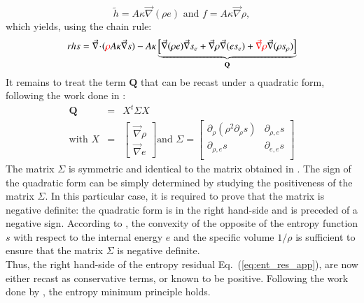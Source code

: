 \documentclass[preprint,10pt]{elsarticle}
\renewcommand{\div}{\vec{\nabla}\! \cdot \!}
\newcommand{\grad}{\vec{\nabla}}
\newcommand{\eqt}[1]{Eq.~(\ref{#1})}                     %
\newcommand{\tcr}[1]{\textcolor{red}{#1}}
\begin{document}
\begin{equation}
\tilde{h} = A \kappa \grad ( \rho e ) \text{ and } f = A \kappa \grad \rho, \nonumber 
\end{equation}
which yields, using the chain rule:
\begin{equation}
rhs = \div (\tcr{\rho} A \kappa \grad s ) - A \kappa \underbrace{\left[ \grad (\rho e) \grad s_e  + \grad \rho \grad (e s_e) +  \tcr{\grad \rho} \grad ( \rho s_{\rho} )  \right]}_{\mathbf{Q}} \nonumber
\end{equation}
It remains to treat the term $\mathbf{Q}$ that can be recast under a quadratic form, following the work done in \cite{jlg}:
\begin{eqnarray}
\mathbf{Q} &=& X^t \Sigma X \nonumber \\
\text{with } X &=& \begin{bmatrix}
\grad \rho \\
\grad e 
\end{bmatrix}
\text{and } \Sigma = \begin{bmatrix}
       \partial_{\rho} (\rho^2 \partial_{\rho} s) & \partial_{\rho,e} s  \\[0.3em]
       \partial_{\rho,e} s & \partial_{e,e} s           \\[0.3em]
     \end{bmatrix} \nonumber 
\end{eqnarray}
The matrix $\Sigma$ is symmetric and identical to the matrix obtained in \cite{jlg}. The sign of the quadratic form can be simply determined by studying the positiveness of the matrix $\Sigma$. In this particular case, it is required to prove that the matrix is negative definite: the quadratic form is in the right hand-side and is preceded of a negative sign. According to \cite{jlg}, the convexity of the opposite of the entropy function $s$ with respect to the internal energy $e$ and the specific volume $1/ \rho$ is sufficient to ensure that the matrix $\Sigma$ is negative definite. \\
Thus, the right hand-side of the entropy residual \eqt{eq:ent_res_app}, are now either recast as conservative terms, or known to be positive. Following the work done by \cite{jlg}, the entropy minimum principle holds.
\end{document}
